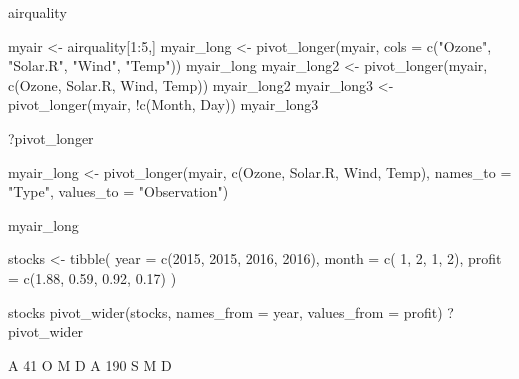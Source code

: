 \documentclass[
]{book}
\newenvironment{Shaded}{\begin{snugshade}}{\end{snugshade}}
\newcommand{\AttributeTok}[1]{\textcolor[rgb]{0.77,0.63,0.00}{#1}}
\newcommand{\DecValTok}[1]{\textcolor[rgb]{0.00,0.00,0.81}{#1}}
\newcommand{\FloatTok}[1]{\textcolor[rgb]{0.00,0.00,0.81}{#1}}
\newcommand{\FunctionTok}[1]{\textcolor[rgb]{0.00,0.00,0.00}{#1}}
\newcommand{\NormalTok}[1]{#1}
\newcommand{\OtherTok}[1]{\textcolor[rgb]{0.56,0.35,0.01}{#1}}
\newcommand{\SpecialCharTok}[1]{\textcolor[rgb]{0.00,0.00,0.00}{#1}}
\newcommand{\StringTok}[1]{\textcolor[rgb]{0.31,0.60,0.02}{#1}}
\begin{document}
\begin{Shaded}
\begin{Highlighting}[]
\NormalTok{airquality}

\NormalTok{myair }\OtherTok{\textless{}{-}}\NormalTok{ airquality[}\DecValTok{1}\SpecialCharTok{:}\DecValTok{5}\NormalTok{,]}
\NormalTok{myair\_long }\OtherTok{\textless{}{-}} \FunctionTok{pivot\_longer}\NormalTok{(myair, }\AttributeTok{cols =} \FunctionTok{c}\NormalTok{(}\StringTok{"Ozone"}\NormalTok{, }\StringTok{"Solar.R"}\NormalTok{, }\StringTok{"Wind"}\NormalTok{, }\StringTok{"Temp"}\NormalTok{))}
\NormalTok{myair\_long }
\NormalTok{myair\_long2 }\OtherTok{\textless{}{-}} \FunctionTok{pivot\_longer}\NormalTok{(myair, }\FunctionTok{c}\NormalTok{(Ozone, Solar.R, Wind, Temp))}
\NormalTok{myair\_long2 }
\NormalTok{myair\_long3 }\OtherTok{\textless{}{-}} \FunctionTok{pivot\_longer}\NormalTok{(myair, }\SpecialCharTok{!}\FunctionTok{c}\NormalTok{(Month, Day))}
\NormalTok{myair\_long3}

\NormalTok{?pivot\_longer}

\NormalTok{myair\_long }\OtherTok{\textless{}{-}} \FunctionTok{pivot\_longer}\NormalTok{(myair, }
                          \FunctionTok{c}\NormalTok{(Ozone, Solar.R, Wind, Temp), }
                          \AttributeTok{names\_to =} \StringTok{"Type"}\NormalTok{, }
                          \AttributeTok{values\_to =} \StringTok{"Observation"}\NormalTok{)}

\NormalTok{myair\_long}

\NormalTok{stocks }\OtherTok{\textless{}{-}} \FunctionTok{tibble}\NormalTok{(}
  \AttributeTok{year   =} \FunctionTok{c}\NormalTok{(}\DecValTok{2015}\NormalTok{, }\DecValTok{2015}\NormalTok{, }\DecValTok{2016}\NormalTok{, }\DecValTok{2016}\NormalTok{),}
  \AttributeTok{month  =} \FunctionTok{c}\NormalTok{(   }\DecValTok{1}\NormalTok{,    }\DecValTok{2}\NormalTok{,     }\DecValTok{1}\NormalTok{,    }\DecValTok{2}\NormalTok{),}
  \AttributeTok{profit =} \FunctionTok{c}\NormalTok{(}\FloatTok{1.88}\NormalTok{, }\FloatTok{0.59}\NormalTok{, }\FloatTok{0.92}\NormalTok{, }\FloatTok{0.17}\NormalTok{)}
\NormalTok{)}

\NormalTok{stocks}
\FunctionTok{pivot\_wider}\NormalTok{(stocks, }\AttributeTok{names\_from =}\NormalTok{ year, }\AttributeTok{values\_from =}\NormalTok{ profit)}
\NormalTok{?pivot\_wider}
\end{Highlighting}
\end{Shaded}

A 41 O M D
A 190 S M D
\end{document}
